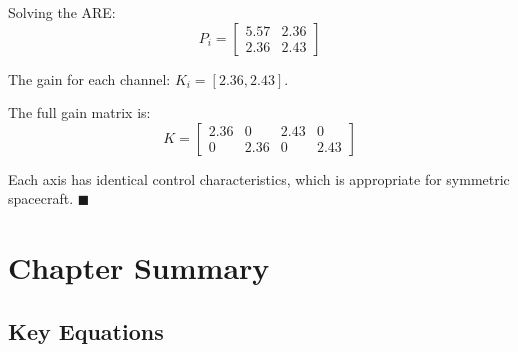 Solving the ARE:
\begin{equation}
P_i = \begin{bmatrix} 5.57 & 2.36 \\ 2.36 & 2.43 \end{bmatrix}
\end{equation}

The gain for each channel: $K_i = [2.36, 2.43]$.

The full gain matrix is:
\begin{equation}
K = \begin{bmatrix} 2.36 & 0 & 2.43 & 0 \\ 0 & 2.36 & 0 & 2.43 \end{bmatrix}
\end{equation}

Each axis has identical control characteristics, which is appropriate for symmetric spacecraft. $\blacksquare$


\section{Chapter Summary}
\label{sec:lqr_summary}

\subsection{Key Equations}

